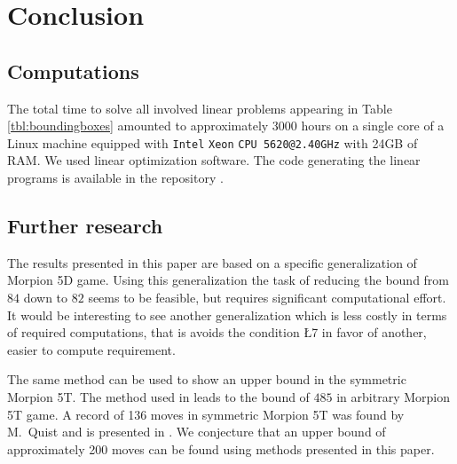 \section{Conclusion}

\subsection{Computations}
The total time to solve all involved linear problems appearing in Table \ref{tbl:boundingboxes} amounted to approximately 3000 hours on a single core of a 
Linux machine equipped with {\tt Intel\textsuperscript{\textregistered}} {\tt Xeon\textsuperscript{\textregistered}} {\tt CPU 5620@2.40GHz} with 24GB of RAM. 
We used \cite{gurobi} linear optimization software. The code generating the linear programs is available in the repository \cite{thewebpage}. 

\subsection{Further research}
The results presented in this paper are based on a specific generalization of Morpion 5D game. Using this generalization the 
task of reducing the bound from $84$ down to $82$ seems to be feasible, but requires significant computational effort. It would be interesting
to see another generalization which is less costly in terms of required computations, that is avoids the condition \L{7} in favor of another, easier to compute 
requirement. 

The same method can be used to show an upper bound in the symmetric Morpion 5T. The method used in \cite{ijcai} leads to the bound of $485$ in arbitrary Morpion 5T game. 
A record of 136 moves in symmetric Morpion 5T was found by M.~Quist and is presented in \cite{boyer}. We conjecture that an upper bound of approximately 200 moves can be found
using methods presented in this paper.  


